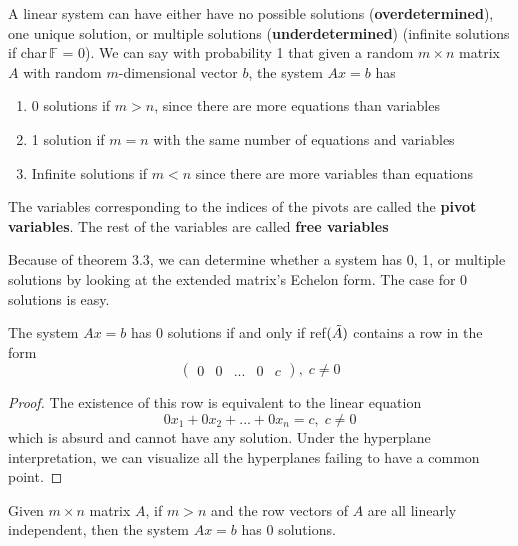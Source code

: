   \begin{definition}
    A linear system can have either have no possible solutions (\textbf{overdetermined}), one unique solution, or multiple solutions (\textbf{underdetermined}) (infinite solutions if char$\, \mathbb{F}$ = 0). We can say with probability 1 that given a random $m \times n$ matrix $A$ with random $m$-dimensional vector $b$, the system $A x = b$ has
    \begin{enumerate}
      \item 0 solutions if $m > n$, since there are more equations than variables
      \item 1 solution if $m = n$ with the same number of equations and variables
      \item Infinite solutions if $m < n$ since there are more variables than equations
    \end{enumerate}
  \end{definition}

  \begin{definition}
    The variables corresponding to the indices of the pivots are called the \textbf{pivot variables}. The rest of the variables are called \textbf{free variables}
  \end{definition}

  Because of theorem 3.3, we can determine whether a system has 0, 1, or multiple solutions by looking at the extended matrix's Echelon form. The case for 0 solutions is easy. 

  \begin{theorem}
    The system $A x = b$ has 0 solutions if and only if ref$(\Tilde{A})$ contains a row in the form 
    \begin{equation}
      \begin{pmatrix}
      0 & 0 & ... & 0 & c
      \end{pmatrix}, \; c \neq 0
    \end{equation}
  \end{theorem}
  \begin{proof}
    The existence of this row is equivalent to the linear equation
    \begin{equation}
      0 x_1 + 0 x_2 + ... + 0 x_n = c, \; c \neq 0
    \end{equation}
    which is absurd and cannot have any solution. Under the hyperplane interpretation, we can visualize all the hyperplanes failing to have a common point. 
  \end{proof}

  \begin{corollary}
    Given $m \times n$ matrix $A$, if $m > n$ and the row vectors of $A$ are all linearly independent, then the system $A x = b$ has 0 solutions. 
  \end{corollary}


